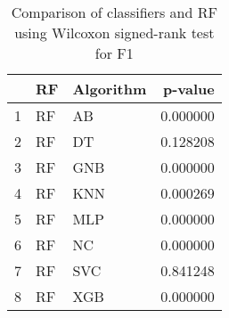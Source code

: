 \begin{table}
\footnotesize
\caption{Comparison of classifiers and RF using Wilcoxon signed-rank test for F1}
\label{tab:RF wilcoxon F1 comparison}
\begin{tabular}{lllr}
\hline
 & RF & Algorithm & p-value \\
\hline
1 & RF & AB & 0.000000 \\
2 & RF & DT & 0.128208 \\
3 & RF & GNB & 0.000000 \\
4 & RF & KNN & 0.000269 \\
5 & RF & MLP & 0.000000 \\
6 & RF & NC & 0.000000 \\
7 & RF & SVC & 0.841248 \\
8 & RF & XGB & 0.000000 \\
\hline
\end{tabular}
\end{table}
